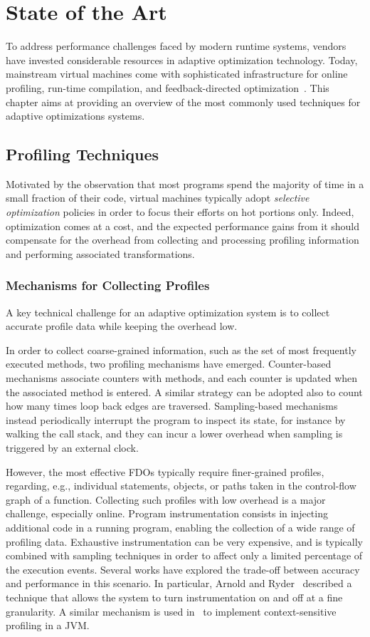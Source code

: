 \chapter{State of the Art}
\label{ch:literature}

To address performance challenges faced by modern runtime systems, vendors have invested considerable resources in adaptive optimization technology. Today, mainstream virtual machines come with sophisticated infrastructure for online profiling, run-time compilation, and feedback-directed optimization~\cite{Arnold05}. This chapter aims at providing an overview of the most commonly used techniques for adaptive optimizations systems.

\section{Profiling Techniques}
Motivated by the observation that most programs spend the majority of time in a small fraction of their code, virtual machines typically adopt {\em selective optimization} policies in order to focus their efforts on hot portions only. Indeed, optimization comes at a cost, and the expected performance gains from it should compensate for the overhead from collecting and processing profiling information and performing associated transformations.

\subsection*{Mechanisms for Collecting Profiles}
A key technical challenge for an adaptive optimization system is to collect accurate profile data while keeping the overhead low.

In order to collect coarse-grained information, such as the set of most frequently executed methods, two profiling mechanisms have emerged. Counter-based mechanisms associate counters with methods, and each counter is updated when the associated method is entered. A similar strategy can be adopted also to count how many times loop back edges are traversed. Sampling-based mechanisms instead periodically interrupt the program to inspect its state, for instance by walking the call stack, and they can incur a lower overhead when sampling is triggered by an external clock.

However, the most effective FDOs typically require finer-grained profiles, regarding, e.g., individual statements, objects, or paths taken in the control-flow graph of a function. Collecting such profiles with low overhead is a major challenge, especially online. Program instrumentation consists in injecting additional code in a running program, enabling the collection of a wide range of profiling data. Exhaustive instrumentation can be very expensive, and is typically combined with sampling techniques in order to affect only a limited percentage of the execution events. Several works have explored the trade-off between accuracy and performance in this scenario. In particular, Arnold and Ryder~\cite{Arnold01} described a technique that allows the system to turn instrumentation on and off at a fine granularity. A similar mechanism is used in~\cite{Zhuang06} to implement context-sensitive profiling in a JVM.

